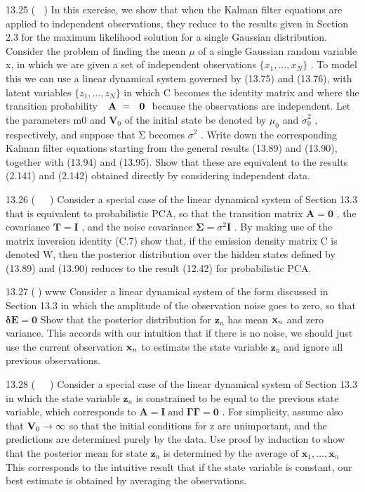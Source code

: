 \documentclass[
  10
]{article}
\begin{document}
13.25 ( ) In this exercise, we show that when the Kalman filter
equations are applied to independent observations, they reduce to the
results given in Section 2.3 for the maximum likelihood solution for a
single Gaussian distribution. Consider the problem of finding the mean
\(\mu\) of a single Gaussian random variable x, in which we are given a
set of independent observations \(\{ x _ { 1 } , \ldots , x _ { N } \}\)
. To model this we can use a linear dynamical system governed by (13.75)
and (13.76), with latent variables
\(\{ z _ { 1 } , \dots , z _ { N } \}\) in which C becomes the identity
matrix and where the transition probability
\(\mathrm { ~ \bf ~ A ~ } = \mathrm { ~ \bf ~ 0 ~ }\) because the
observations are independent. Let the parameters m0 and
\(\mathbf { V } _ { 0 }\) of the initial state be denoted by
\(\mu _ { 0 }\) and \(\dot { \sigma } _ { 0 } ^ { 2 }\) , respectively,
and suppose that Σ becomes \(\sigma ^ { 2 }\) . Write down the
corresponding Kalman filter equations starting from the general results
(13.89) and (13.90), together with (13.94) and (13.95). Show that these
are equivalent to the results (2.141) and (2.142) obtained directly by
considering independent data.

13.26 (  ) Consider a special case of the linear dynamical system of
Section 13.3 that is equivalent to probabilistic PCA, so that the
transition matrix \(\mathbf A = \mathbf 0\) , the covariance
\(\mathbf { T } = \mathbf { I }\) , and the noise covariance
\(\pmb { \Sigma } = \sigma ^ { 2 } \mathbf { I }\) . By making use of
the matrix inversion identity (C.7) show that, if the emission density
matrix C is denoted W, then the posterior distribution over the hidden
states defined by (13.89) and (13.90) reduces to the result (12.42) for
probabilistic PCA.

13.27 () www Consider a linear dynamical system of the form discussed in
Section 13.3 in which the amplitude of the observation noise goes to
zero, so that \(\mathbf { \delta E = 0 }\) Show that the posterior
distribution for \(\mathbf { z } _ { n }\) has mean
\({ \bf x } _ { n }\) and zero variance. This accords with our intuition
that if there is no noise, we should just use the current observation
\({ \bf x } _ { n }\) to estimate the state variable
\(\mathbf { z } _ { n }\) and ignore all previous observations.

13.28 (  ) Consider a special case of the linear dynamical system of
Section 13.3 in which the state variable \(\mathbf { z } _ { n }\) is
constrained to be equal to the previous state variable, which
corresponds to
\(\mathbf { A } = \mathbf { I } \operatorname { a n d } \mathbf { \Gamma } \mathbf { \Gamma } = \mathbf { 0 }\)
. For simplicity, assume also that \({ \bf V } _ { 0 } \to \infty\) so
that the initial conditions for z are unimportant, and the predictions
are determined purely by the data. Use proof by induction to show that
the posterior mean for state \(\mathbf { z } _ { n }\) is determined by
the average of
\(\mathbf { x } _ { 1 } , \ldots , \mathbf { x } _ { n }\) This
corresponds to the intuitive result that if the state variable is
constant, our best estimate is obtained by averaging the observations.
\end{document}
